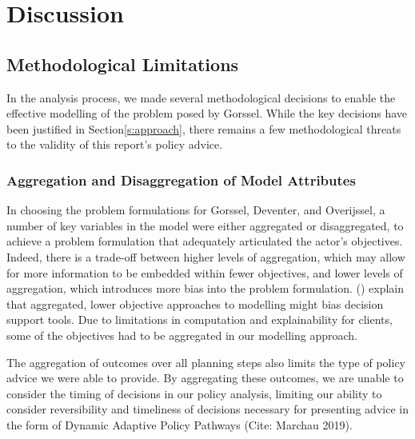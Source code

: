 \section{Discussion}
\label{s:discussion}




\subsection{Methodological Limitations}
In the analysis process, we made several methodological decisions to enable the effective modelling of the problem posed by Gorssel. While the key decisions have been justified in Section\ref{s:approach}, there remains a few methodological threats to the validity of this report's policy advice.

\subsubsection{Aggregation and Disaggregation of Model Attributes}
In choosing the problem formulations for Gorssel, Deventer, and Overijssel, a number of key variables in the model were either aggregated or disaggregated, to achieve a problem formulation that adequately articulated the actor's objectives. Indeed, there is a trade-off between higher levels of aggregation, which may allow for more information to be embedded within fewer objectives, and lower levels of aggregation, which introduces more bias into the problem formulation. \citeauthor{kasprzyk_battling_2016} (\citeyear{kasprzyk_battling_2016}) explain that aggregated, lower objective approaches to modelling might bias decision support tools. Due to limitations in computation and explainability for clients, some of the objectives had to be aggregated in our modelling approach. 

The aggregation of outcomes over all planning steps also limits the type of policy advice we were able to provide. By aggregating these outcomes, we are unable to consider the timing of decisions in our policy analysis, limiting our ability to consider reversibility and timeliness of decisions necessary for presenting advice in the form of Dynamic Adaptive Policy Pathways \parencite{kwakkel_coping_2016} (Cite: Marchau 2019).

